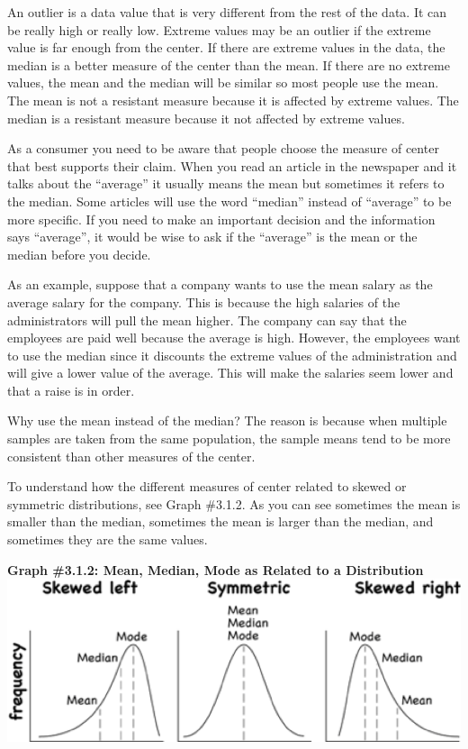 \documentclass[
]{book}
\begin{document}
An outlier is a data value that is very different from the rest of the data. It can be really high or really low. Extreme values may be an outlier if the extreme value is far enough from the center. If there are extreme values in the data, the median is a better measure of the center than the mean. If there are no extreme values, the mean and the median will be similar so most people use the mean. The mean is not a resistant measure because it is affected by extreme values. The median is a resistant measure because it not affected by extreme values.

As a consumer you need to be aware that people choose the measure of center that best supports their claim. When you read an article in the newspaper and it talks about the ``average'' it usually means the mean but sometimes it refers to the median. Some articles will use the word ``median'' instead of ``average'' to be more specific. If you need to make an important decision and the information says ``average'', it would be wise to ask if the ``average'' is the mean or the median before you decide.

As an example, suppose that a company wants to use the mean salary as the average salary for the company. This is because the high salaries of the administrators will pull the mean higher. The company can say that the employees are paid well because the average is high. However, the employees want to use the median since it discounts the extreme values of the administration and will give a lower value of the average. This will make the salaries seem lower and that a raise is in order.

Why use the mean instead of the median? The reason is because when multiple samples are taken from the same population, the sample means tend to be more consistent than other measures of the center.

To understand how the different measures of center related to skewed or symmetric distributions, see Graph \#3.1.2. As you can see sometimes the mean is smaller than the median, sometimes the mean is larger than the median, and sometimes they are the same values.

\textbf{Graph \#3.1.2: Mean, Median, Mode as Related to a Distribution}
\includegraphics{centers_distribution.png}
\end{document}
